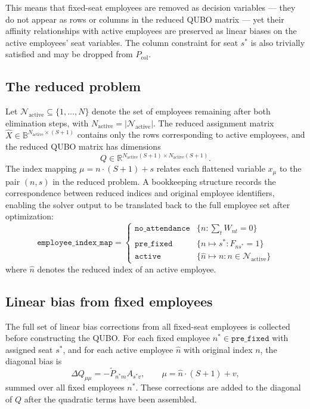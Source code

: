 \documentclass[10pt]{article}
\theoremstyle{definition}
\theoremstyle{plain}
\theoremstyle{remark}
\begin{document}
	This means that fixed-seat employees are removed as decision variables — they do 
	not appear as rows or columns in the reduced QUBO matrix — yet their affinity 
	relationships with active employees are preserved as linear biases on the active 
	employees' seat variables. The column constraint for seat $s^*$ is also trivially 
	satisfied and may be dropped from $P_\text{col}$.
	
	\subsection{The reduced problem}
	
	Let $\mathcal{N}_\text{active} \subseteq \{1, \dots, N\}$ denote the set of 
	employees remaining after both elimination steps, with $N_\text{active} = 
	|\mathcal{N}_\text{active}|$. The reduced assignment matrix $\hat{X} \in 
	\mathbb{B}^{N_\text{active} \times (S+1)}$ contains only the rows corresponding 
	to active employees, and the reduced QUBO matrix has dimensions
	\begin{equation}
	Q \in \mathbb{R}^{N_\text{active}(S+1) \times N_\text{active}(S+1)}.
	\end{equation}
	The index mapping $\mu = n \cdot (S+1) + s$ relates each flattened variable 
	$x_\mu$ to the pair $(n, s)$ in the reduced problem. A bookkeeping structure 
	records the correspondence between reduced indices and original employee 
	identifiers, enabling the solver output to be translated back to the full employee 
	set after optimization:
	\begin{equation}
	\texttt{employee\_index\_map} = \begin{cases}
		\texttt{no\_attendance} & \{n : \sum_t W_{nt} = 0\} \\
		\texttt{pre\_fixed} & \{n \mapsto s^* : F_{ns^*} = 1\} \\
		\texttt{active} & \{\hat{n} \mapsto n : n \in \mathcal{N}_\text{active}\}
	\end{cases}
	\end{equation}
	where $\hat{n}$ denotes the reduced index of an active employee.
	
	\subsection{Linear bias from fixed employees}
	
	The full set of linear bias corrections from all fixed-seat employees is collected 
	before constructing the QUBO. For each fixed employee $n^* \in \texttt{pre\_fixed}$ 
	with assigned seat $s^*$, and for each active employee $\hat{n}$ with original index 
	$n$, the diagonal bias is
	\begin{equation}
	\Delta Q_{\mu\mu} = -\tilde{P}_{n^* m} A_{s^* v}, 
	\qquad \mu = \hat{n} \cdot (S+1) + v,
	\end{equation}
	summed over all fixed employees $n^*$. These corrections are added to the diagonal 
	of $Q$ after the quadratic terms have been assembled.
	
\end{document}
